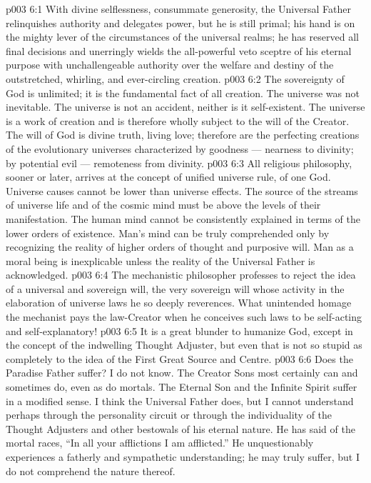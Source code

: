 \vs p003 6:1 With divine selflessness, consummate generosity, the Universal Father relinquishes authority and delegates power, but he is still primal; his hand is on the mighty lever of the circumstances of the universal realms; he has reserved all final decisions and unerringly wields the all\hyp{}powerful veto sceptre of his eternal purpose with unchallengeable authority over the welfare and destiny of the outstretched, whirling, and ever\hyp{}circling creation.
\vs p003 6:2 The sovereignty of God is unlimited; it is the fundamental fact of all creation. The universe was not inevitable. The universe is not an accident, neither is it self\hyp{}existent. The universe is a work of creation and is therefore wholly subject to the will of the Creator. The will of God is divine truth, living love; therefore are the perfecting creations of the evolutionary universes characterized by goodness --- nearness to divinity; by potential evil --- remoteness from divinity.
\vs p003 6:3 \pc All religious philosophy, sooner or later, arrives at the concept of unified universe rule, of one God. Universe causes cannot be lower than universe effects. The source of the streams of universe life and of the cosmic mind must be above the levels of their manifestation. The human mind cannot be consistently explained in terms of the lower orders of existence. Man’s mind can be truly comprehended only by recognizing the reality of higher orders of thought and purposive will. Man as a moral being is inexplicable unless the reality of the Universal Father is acknowledged.
\vs p003 6:4 The mechanistic philosopher professes to reject the idea of a universal and sovereign will, the very sovereign will whose activity in the elaboration of universe laws he so deeply reverences. What unintended homage the mechanist pays the law\hyp{}Creator when he conceives such laws to be self\hyp{}acting and self\hyp{}explanatory!
\vs p003 6:5 It is a great blunder to humanize God, except in the concept of the indwelling Thought Adjuster, but even that is not so stupid as completely to  the idea of the First Great Source and Centre.
\vs p003 6:6 \pc Does the Paradise Father suffer? I do not know. The Creator Sons most certainly can and sometimes do, even as do mortals. The Eternal Son and the Infinite Spirit suffer in a modified sense. I think the Universal Father does, but I cannot understand  perhaps through the personality circuit or through the individuality of the Thought Adjusters and other bestowals of his eternal nature. He has said of the mortal races, “In all your afflictions I am afflicted.” He unquestionably experiences a fatherly and sympathetic understanding; he may truly suffer, but I do not comprehend the nature thereof.
